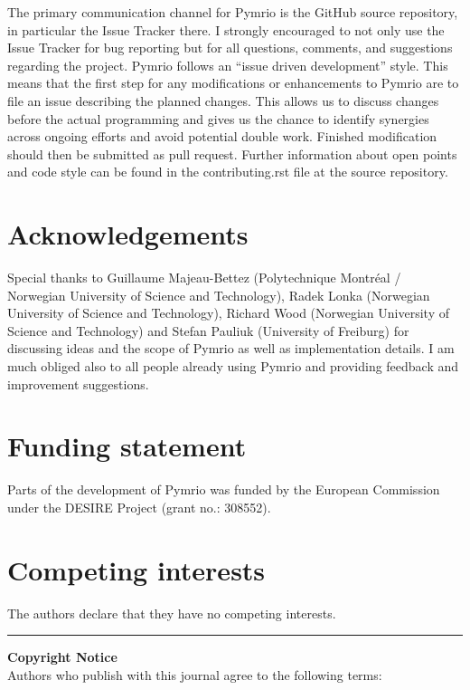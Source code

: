 \documentclass{jors}
\begin{document}
The primary communication channel for Pymrio is the GitHub source repository, in particular the Issue Tracker there. 
I strongly encouraged to not only use the Issue Tracker for bug reporting but for all questions, comments, and suggestions regarding the project.
Pymrio follows an ``issue driven development'' style. This means that the first step for any modifications or enhancements to Pymrio are to file an issue describing the planned changes.
This allows us to discuss changes before the actual programming and gives us the chance to identify synergies across ongoing efforts and avoid potential double work. 
Finished modification should then be submitted as pull request. Further information about open points and code style can be found in the contributing.rst file at the source repository.

\section*{Acknowledgements}
Special thanks to 
Guillaume Majeau-Bettez (Polytechnique Montréal / Norwegian University of Science and Technology), 
Radek Lonka (Norwegian University of Science and Technology),
Richard Wood (Norwegian University of Science and Technology) and
Stefan Pauliuk (University of Freiburg) 
for discussing ideas and the scope of Pymrio as well as implementation details.
I am much obliged also to all people already using Pymrio and providing feedback and improvement suggestions. 


\section*{Funding statement}

Parts of the development of Pymrio was funded by the European Commission under the DESIRE Project (grant no.: 308552).

\section*{Competing interests}

The authors declare that they have no competing interests.



\printbibliography  

\vspace{2cm}

\rule{\textwidth}{1pt}

{ \bf Copyright Notice} \\
Authors who publish with this journal agree to the following terms: \\
\end{document}
